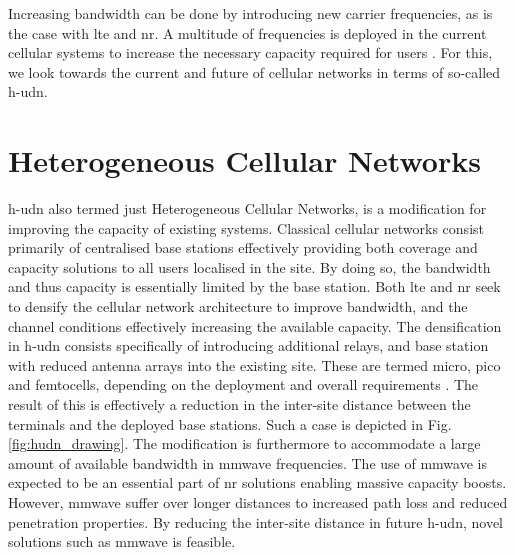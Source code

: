 Increasing bandwidth can be done by introducing new carrier frequencies, as is the case with \gls{lte} and \gls{nr}. A multitude of frequencies is deployed in the current cellular systems to increase the necessary capacity required for users \cite{Goldsmith2005WirelessCommunications, Molisch2007}. For this, we look towards the current and future of cellular networks in terms of so-called \gls{h-udn}.



\section{Heterogeneous Cellular Networks}
\gls{h-udn} also termed just Heterogeneous Cellular Networks, is a modification for improving the capacity of existing systems. Classical cellular networks consist primarily of centralised base stations effectively providing both coverage and capacity solutions to all users localised in the site. By doing so, the bandwidth and thus capacity is essentially limited by the base station. Both \gls{lte} and \gls{nr} seek to densify the cellular network architecture to improve bandwidth, and the channel conditions effectively increasing the available capacity. The densification in \gls{h-udn} consists specifically of introducing additional relays, and base station with reduced antenna arrays into the existing site. These are termed micro, pico and femtocells, depending on the deployment and overall requirements \cite{Yunas2015, Ge2016}. The result of this is effectively a reduction in the inter-site distance between the terminals and the deployed base stations. Such a case is depicted in Fig. \ref{fig:hudn_drawing}. The modification is furthermore to accommodate a large amount of available bandwidth in \gls{mmwave} frequencies. The use of \gls{mmwave} is expected to be an essential part of \gls{nr} solutions enabling massive capacity boosts. However, \gls{mmwave} suffer over longer distances to increased path loss and reduced penetration properties. By reducing the inter-site distance in future \gls{h-udn}, novel solutions such as \gls{mmwave} is feasible. 

